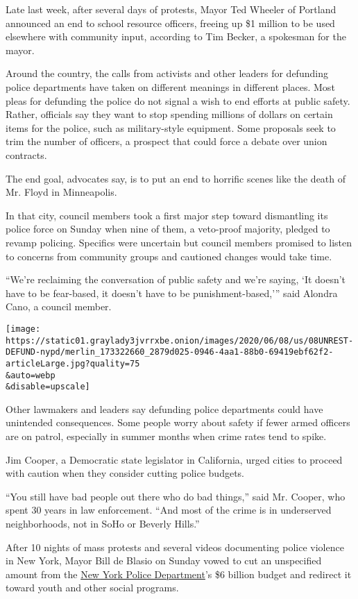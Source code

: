 Late last week, after several days of protests, Mayor Ted Wheeler of
Portland announced an end to school resource officers, freeing up \$1
million to be used elsewhere with community input, according to Tim
Becker, a spokesman for the mayor.

Around the country, the calls from activists and other leaders for
defunding police departments have taken on different meanings in
different places. Most pleas for defunding the police do not signal a
wish to end efforts at public safety. Rather, officials say they want to
stop spending millions of dollars on certain items for the police, such
as military-style equipment. Some proposals seek to trim the number of
officers, a prospect that could force a debate over union contracts.

The end goal, advocates say, is to put an end to horrific scenes like
the death of Mr. Floyd in Minneapolis.

In that city, council members took a first major step toward dismantling
its police force on Sunday when nine of them, a veto-proof majority,
pledged to revamp policing. Specifics were uncertain but council members
promised to listen to concerns from community groups and cautioned
changes would take time.

``We're reclaiming the conversation of public safety and we're saying,
`It doesn't have to be fear-based, it doesn't have to be
punishment-based,''' said Alondra Cano, a council member.

\texttt{[image: https://static01.graylady3jvrrxbe.onion/images/2020/06/08/us/08UNREST-DEFUND-nypd/merlin\_173322660\_2879d025-0946-4aa1-88b0-69419ebf62f2-articleLarge.jpg?quality=75\\\&auto=webp\\\&disable=upscale]}

Other lawmakers and leaders say defunding police departments could have
unintended consequences. Some people worry about safety if fewer armed
officers are on patrol, especially in summer months when crime rates
tend to spike.

Jim Cooper, a Democratic state legislator in California, urged cities to
proceed with caution when they consider cutting police budgets.

``You still have bad people out there who do bad things,'' said Mr.
Cooper, who spent 30 years in law enforcement. ``And most of the crime
is in underserved neighborhoods, not in SoHo or Beverly Hills.''

After 10 nights of mass protests and several videos documenting police
violence in New York, Mayor Bill de Blasio on Sunday vowed to cut an
unspecified amount from the
\href{https://www.nytimes3xbfgragh.onion/2020/06/15/nyregion/nypd-plainclothes-cops.html}{New
York Police Department}'s \$6 billion budget and redirect it toward
youth and other social programs.

